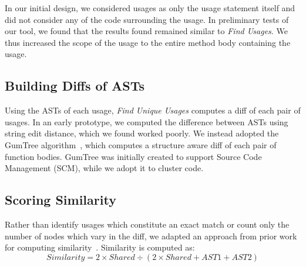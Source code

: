 \documentclass[conference]{IEEEtran}
\begin{document}
In our initial design, we considered usages as only the usage statement itself and did not consider any of the code surrounding the usage. In preliminary tests of our tool, we found that the results found remained similar to \textit{Find Usages}. We thus increased the scope of the usage to the entire method body containing the usage. 
\par





\subsection{Building Diffs of ASTs}

Using the ASTs of each usage, \textit{Find Unique Usages} computes a diff of each pair of usages. In an early prototype, we computed the difference between ASTs using string edit distance, which we found worked poorly. We instead adopted the GumTree algorithm~\cite{baxter1998clone,DBLP:conf/kbse/FalleriMBMM14,falleri2014fine}, which computes a structure aware diff of each pair of function bodies. GumTree was initially created to support Source Code Management (SCM), while we adopt it to cluster code. \par

\subsection{Scoring Similarity}
Rather than identify usages which constitute an exact match or count only the number of nodes which vary in the diff, we adapted an approach from prior work for computing similarity~\cite{baxter1998clone}. 
Similarity is computed as:
\begin{equation}
Similarity = 2 \times Shared  \div (2  \times Shared  + AST1 + AST2)
\label{equation1}
\end{equation}
\end{document}
